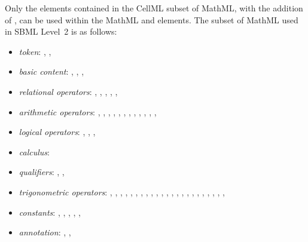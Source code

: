 \documentclass[10pt,twocolumntoc]{cekarticle}
\begin{document}
Only the elements contained in the CellML subset of MathML, with the
addition of , can be used within the MathML  and
 elements.  The subset of MathML used in SBML Level~2 is as
follows:

\begin{itemize}

\item \emph{token}: , , 

\item \emph{basic content}: , ,
, 

\item \emph{relational operators}:
            , , , , , 

\item \emph{arithmetic operators}:
            , , ,
            , , ,
            , , , ,
            , , 

\item \emph{logical operators}:
            , , , 

\item \emph{calculus}:

\item \emph{qualifiers}:
            , , 

\item \emph{trigonometric operators}:
            , , , ,
            , , , ,
            , , ,
            , , ,
            , , , ,
            , , ,
            , , 

\item \emph{constants}:
            , , ,
            , , 

\item \emph{annotation}:
            , ,
\end{itemize}
\end{document}
